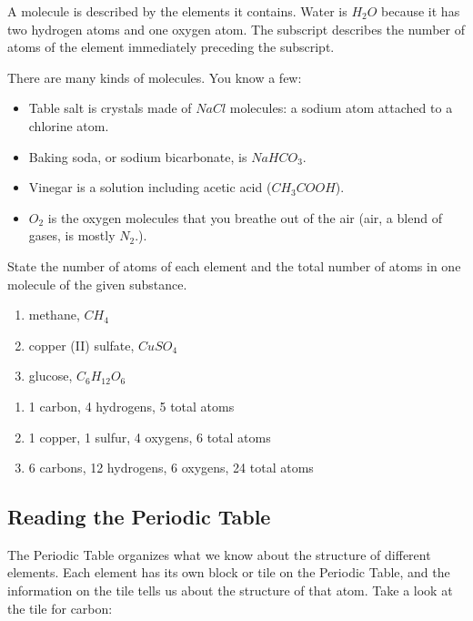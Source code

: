 A molecule is described by the elements it contains. Water is $H_2O$
because it has two hydrogen atoms and one oxygen atom. The subscript describes 
the number of atoms of the element immediately preceding the subscript. 

There are many kinds of molecules. You know a few:
\begin{itemize}
\item Table salt is crystals made of $NaCl$ molecules: a sodium atom attached 
to a chlorine atom.
\item Baking soda, or sodium bicarbonate, is $NaHCO_3$.
\item Vinegar is a solution including acetic acid ($CH_3COOH$).
\item $O_2$ is the oxygen molecules that you breathe out of the air (air, a 
blend of gases, is mostly $N_2$.).
\end{itemize}

\begin{Exercise}[title = {Numbers of Atoms in Molecules}, label = num_atom]
State the number of atoms of each element and the total number of atoms in one 
molecule of the given substance.
\begin{enumerate}
\item methane, $CH_4$
\item copper (II) sulfate, $CuSO_4$
\item glucose, $C_6H_{12}O_6$
\end{enumerate}
\end{Exercise}

\begin{Answer}[ref = num_atom]
\begin{enumerate}
\item 1 carbon, 4 hydrogens, 5 total atoms
\item 1 copper, 1 sulfur, 4 oxygens, 6 total atoms
\item 6 carbons, 12 hydrogens, 6 oxygens, 24 total atoms
\end{enumerate}
\end{Answer}

\subsection{Reading the Periodic Table}
The Periodic Table organizes what we know about the structure of different
elements. Each element has its own block or tile on the Periodic Table, and the
information on the tile tells us about the structure of that atom. Take a look at
the tile for carbon:

